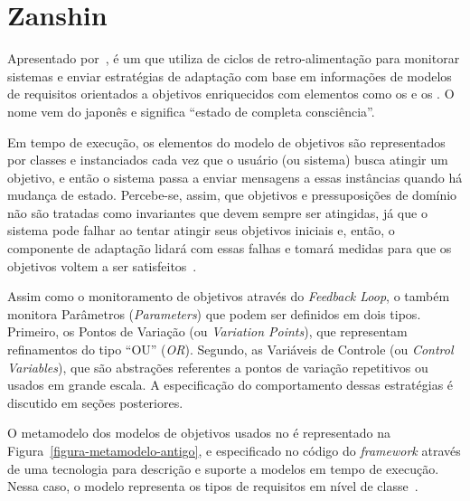 
\section{Zanshin}
\label{sec-referencial-zanshin}

Apresentado por~, \zanshin é um \framework que utiliza de ciclos de retro-alimentação para monitorar sistemas e enviar estratégias de adaptação com base em informações de modelos de requisitos orientados a objetivos enriquecidos com elementos como os \awreqs e os \evoreqs. O nome \zanshin vem do japonês e significa ``estado de completa consciência''.

Em tempo de execução, os elementos do modelo de objetivos são representados por classes e instanciados cada vez que o usuário (ou sistema) busca atingir um objetivo, e então o sistema passa a enviar mensagens a essas instâncias quando há mudança de estado. Percebe-se, assim, que objetivos e pressuposições de domínio não são tratadas como invariantes que devem sempre ser atingidas, já que o sistema pode falhar ao tentar atingir seus objetivos iniciais e, então, o componente de adaptação lidará com essas falhas e tomará medidas para que os objetivos voltem a ser satisfeitos~\cite{souza2013requirements}.

Assim como o monitoramento de objetivos através do \textit{Feedback Loop}, o \zanshin também monitora Parâmetros (\textit{Parameters}) que podem ser definidos em dois tipos. Primeiro, os Pontos de Variação (ou \textit{Variation Points}), que representam refinamentos do tipo ``OU'' (\textit{OR}). Segundo, as Variáveis de Controle (ou \textit{Control Variables}), que são abstrações referentes a pontos de variação repetitivos ou usados em grande escala. A especificação do comportamento dessas estratégias é discutido em seções posteriores.

O metamodelo dos modelos de objetivos usados no \zanshin é representado na Figura~\ref{figura-metamodelo-antigo}, e especificado no código do \textit{framework} através de uma tecnologia \ecore para descrição e suporte a modelos em tempo de execução. Nessa caso, o modelo representa os tipos de requisitos em nível de classe~\cite{souza2013requirements}. 


